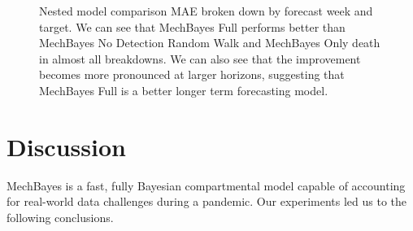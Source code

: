 \documentclass[11pt]{amsart}
\begin{document}
\begin{figure}
\caption{Nested model comparison MAE broken down by forecast week and target. We can see that MechBayes Full performs better than MechBayes No Detection Random Walk and MechBayes Only death in almost all breakdowns. We can also see that the improvement becomes more pronounced at larger horizons, suggesting that MechBayes Full is a better longer term forecasting model.  }
\label{fig:ablation}
\end{figure}




\section{Discussion}

MechBayes is a fast, fully Bayesian compartmental model capable of accounting for real-world data challenges during a pandemic. Our experiments led us to the following conclusions.
\end{document}
